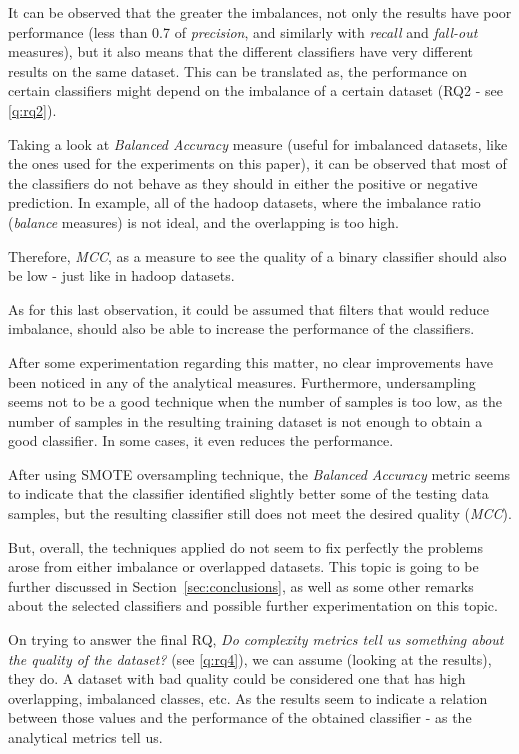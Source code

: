 It can be observed that the greater the imbalances, not only the results have 
poor performance (less than 0.7 of \textit{precision}, and similarly with 
\textit{recall} and \textit{fall-out} measures), but it also means that the 
different classifiers have very different results on the same dataset. This can 
be translated as, the performance on certain classifiers might depend on the 
imbalance of a certain dataset (RQ2 - see \ref{q:rq2}).

Taking a look at \textit{Balanced Accuracy} measure (useful for imbalanced 
datasets, like the ones used for the experiments on this paper), it can be 
observed that most of the classifiers do not behave as they should in either
the positive or negative prediction. In example, all of the hadoop datasets,
where the imbalance ratio (\textit{balance} measures) is not ideal, and the
overlapping is too high. 

Therefore, \textit{MCC}, as a measure to see the quality of a binary classifier
should also be low - just like in hadoop datasets.

As for this last observation, it could be assumed that filters that would reduce
imbalance, should also be able to increase the performance of the classifiers.

After some experimentation regarding this matter, no clear improvements have
been noticed in any of the analytical measures. Furthermore, undersampling
seems not to be a good technique when the number of samples is too low, as the
number of samples in the resulting training dataset is not enough to obtain a
good classifier. In some cases, it even reduces the performance.

After using SMOTE oversampling technique, the \textit{Balanced Accuracy} metric
seems to indicate that the classifier identified slightly better some of the 
testing data samples, but the resulting classifier still does not meet the
desired quality (\textit{MCC}).

But, overall, the techniques applied do not seem to fix perfectly the problems
arose from either imbalance or overlapped datasets. This topic is going to be
further discussed in Section~\ref{sec:conclusions}, as well as some other 
remarks about the selected classifiers and possible further experimentation on
this topic.

On trying to answer the final RQ, \textit{Do complexity metrics tell us 
something about the quality of the dataset?} (see \ref{q:rq4}), we can assume 
(looking at the results), they do. A dataset with bad quality could be 
considered one that has high overlapping, imbalanced classes, etc. As the 
results seem to indicate a relation between those values and the performance of
the obtained classifier - as the analytical metrics tell us.

\lhead{}






